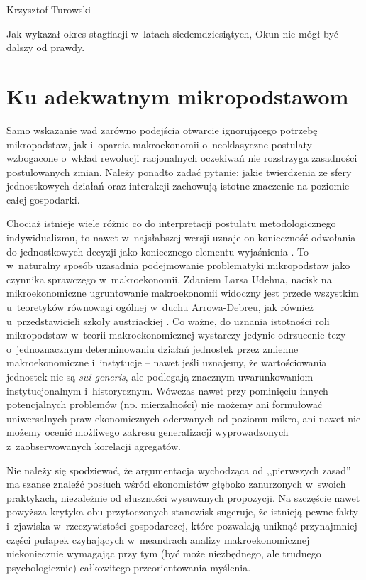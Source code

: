 \begin{artplenv}{Krzysztof Turowski}

Jak wykazał okres stagflacji w~latach siedemdziesiątych, Okun nie mógł być dalszy od prawdy.

\section{Ku adekwatnym mikropodstawom}
Samo wskazanie wad zarówno podejścia otwarcie ignorującego potrzebę mikropodstaw, jak i~oparcia
makroekonomii o~neoklasyczne postulaty wzbogacone o~wkład rewolucji racjonalnych oczekiwań nie rozstrzyga zasadności postulowanych
zmian. Należy ponadto zadać pytanie: jakie twierdzenia ze sfery jednostkowych działań oraz interakcji zachowują istotne
znaczenie na poziomie całej gospodarki.

Chociaż istnieje wiele różnic co do interpretacji postulatu metodologicznego indywidualizmu, to nawet w~najsłabszej
wersji uznaje on konieczność odwołania do jednostkowych decyzji jako koniecznego elementu wyjaśnienia
\parencite{udehn_methodological_2001}.
To w~naturalny sposób uzasadnia podejmowanie problematyki mikropodstaw jako
czynnika sprawczego w~makroekonomii. Zdaniem Larsa Udehna, nacisk na mikroekonomiczne ugruntowanie makroekonomii widoczny
jest przede wszystkim u~teoretyków równowagi ogólnej w~duchu Arrowa-Debreu, jak również u~przedstawicieli szkoły
austriackiej
\parencite{udehn_changing_2002}.
Co ważne, do uznania istotności roli mikropodstaw w~teorii
makroekonomicznej wystarczy jedynie odrzucenie tezy o~jednoznacznym determinowaniu działań jednostek przez zmienne
makroekonomiczne i~instytucje -- nawet jeśli uznajemy, że wartościowania jednostek nie są \textit{sui generis}, ale
podlegają znacznym uwarunkowaniom instytucjonalnym i~historycznym. Wówczas nawet przy pominięciu innych potencjalnych
problemów (np. mierzalności) nie możemy ani formułować uniwersalnych praw ekonomicznych oderwanych od poziomu mikro,
ani nawet nie możemy ocenić możliwego zakresu generalizacji wyprowadzonych z~zaobserwowanych korelacji agregatów.

Nie należy się spodziewać, że argumentacja wychodząca od ,,pierwszych zasad'' ma szanse znaleźć posłuch wśród ekonomistów
głęboko zanurzonych w~swoich praktykach, niezależnie od słuszności wysuwanych propozycji. Na szczęście nawet powyższa
krytyka obu przytoczonych stanowisk sugeruje, że istnieją pewne fakty i~zjawiska w~rzeczywistości gospodarczej, które
pozwalają uniknąć przynajmniej części pułapek czyhających w~meandrach analizy makroekonomicznej niekoniecznie wymagając
przy tym (być może niezbędnego, ale trudnego psychologicznie) całkowitego przeorientowania myślenia.


\end{artplenv}
